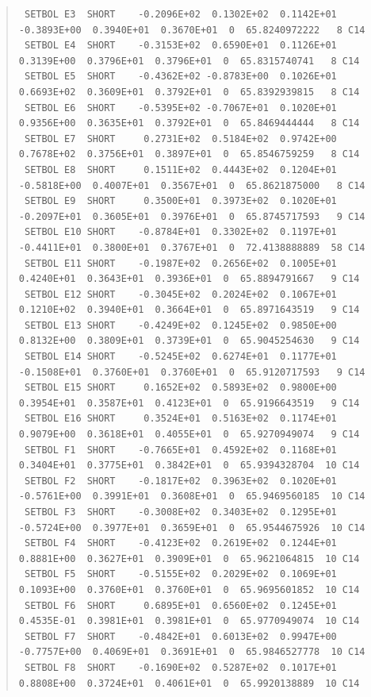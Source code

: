 \documentclass[twoside,11pt]{article}
\newenvironment{myquote}{\begin{quote}\begin{small}}{\end{small}\end{quote}}
\renewcommand{\_}{\texttt{\symbol{95}}}
\begin{document}
\begin{landscape}
\begin{myquote}
\begin{verbatim}
 SETBOL E3  SHORT    -0.2096E+02  0.1302E+02  0.1142E+01 -0.3893E+00  0.3940E+01  0.3670E+01  0  65.8240972222   8 C14
 SETBOL E4  SHORT    -0.3153E+02  0.6590E+01  0.1126E+01  0.3139E+00  0.3796E+01  0.3796E+01  0  65.8315740741   8 C14
 SETBOL E5  SHORT    -0.4362E+02 -0.8783E+00  0.1026E+01  0.6693E+02  0.3609E+01  0.3792E+01  0  65.8392939815   8 C14
 SETBOL E6  SHORT    -0.5395E+02 -0.7067E+01  0.1020E+01  0.9356E+00  0.3635E+01  0.3792E+01  0  65.8469444444   8 C14
 SETBOL E7  SHORT     0.2731E+02  0.5184E+02  0.9742E+00  0.7678E+02  0.3756E+01  0.3897E+01  0  65.8546759259   8 C14
 SETBOL E8  SHORT     0.1511E+02  0.4443E+02  0.1204E+01 -0.5818E+00  0.4007E+01  0.3567E+01  0  65.8621875000   8 C14
 SETBOL E9  SHORT     0.3500E+01  0.3973E+02  0.1020E+01 -0.2097E+01  0.3605E+01  0.3976E+01  0  65.8745717593   9 C14
 SETBOL E10 SHORT    -0.8784E+01  0.3302E+02  0.1197E+01 -0.4411E+01  0.3800E+01  0.3767E+01  0  72.4138888889  58 C14
 SETBOL E11 SHORT    -0.1987E+02  0.2656E+02  0.1005E+01  0.4240E+01  0.3643E+01  0.3936E+01  0  65.8894791667   9 C14
 SETBOL E12 SHORT    -0.3045E+02  0.2024E+02  0.1067E+01  0.1210E+02  0.3940E+01  0.3664E+01  0  65.8971643519   9 C14
 SETBOL E13 SHORT    -0.4249E+02  0.1245E+02  0.9850E+00  0.8132E+00  0.3809E+01  0.3739E+01  0  65.9045254630   9 C14
 SETBOL E14 SHORT    -0.5245E+02  0.6274E+01  0.1177E+01 -0.1508E+01  0.3760E+01  0.3760E+01  0  65.9120717593   9 C14
 SETBOL E15 SHORT     0.1652E+02  0.5893E+02  0.9800E+00  0.3954E+01  0.3587E+01  0.4123E+01  0  65.9196643519   9 C14
 SETBOL E16 SHORT     0.3524E+01  0.5163E+02  0.1174E+01  0.9079E+00  0.3618E+01  0.4055E+01  0  65.9270949074   9 C14
 SETBOL F1  SHORT    -0.7665E+01  0.4592E+02  0.1168E+01  0.3404E+01  0.3775E+01  0.3842E+01  0  65.9394328704  10 C14
 SETBOL F2  SHORT    -0.1817E+02  0.3963E+02  0.1020E+01 -0.5761E+00  0.3991E+01  0.3608E+01  0  65.9469560185  10 C14
 SETBOL F3  SHORT    -0.3008E+02  0.3403E+02  0.1295E+01 -0.5724E+00  0.3977E+01  0.3659E+01  0  65.9544675926  10 C14
 SETBOL F4  SHORT    -0.4123E+02  0.2619E+02  0.1244E+01  0.8881E+00  0.3627E+01  0.3909E+01  0  65.9621064815  10 C14
 SETBOL F5  SHORT    -0.5155E+02  0.2029E+02  0.1069E+01  0.1093E+00  0.3760E+01  0.3760E+01  0  65.9695601852  10 C14
 SETBOL F6  SHORT     0.6895E+01  0.6560E+02  0.1245E+01  0.4535E-01  0.3981E+01  0.3981E+01  0  65.9770949074  10 C14
 SETBOL F7  SHORT    -0.4842E+01  0.6013E+02  0.9947E+00 -0.7757E+00  0.4069E+01  0.3691E+01  0  65.9846527778  10 C14
 SETBOL F8  SHORT    -0.1690E+02  0.5287E+02  0.1017E+01  0.8808E+00  0.3724E+01  0.4061E+01  0  65.9920138889  10 C14

\end{verbatim}
\end{myquote}
\end{landscape}
\end{document}
